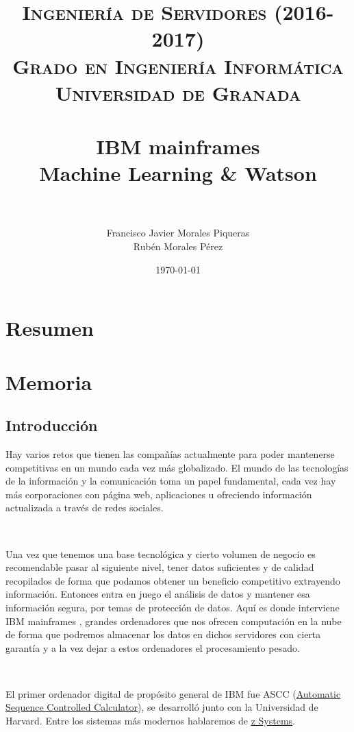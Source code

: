 \documentclass[paper=a4, fontsize=10pt]{scrartcl} %
\title{	
\normalfont \normalsize 
\textsc{\textbf{Ingeniería de Servidores (2016-2017)} \\ Grado en Ingeniería Informática \\ Universidad de Granada} \\ [25pt] %
\horrule{0.5pt} \\[0.4cm] %
\huge IBM mainframes \\ Machine Learning \& Watson \\ %
\horrule{2pt} \\[0.5cm] %
}
\author{Francisco Javier Morales Piqueras
	\\ Rubén Morales Pérez} %
\date{\normalsize\today} %
\numberwithin{equation}{section} %
\numberwithin{figure}{section} %
\numberwithin{table}{section} %
\begin{document}
\maketitle %
\newpage %
\tableofcontents %
\listoffigures
\listoftables

\newpage


\section{Resumen}


\section{Memoria}
\subsection{Introducción}
Hay varios retos que tienen las compañías actualmente para poder mantenerse competitivas en un mundo cada vez más globalizado.
El mundo de las tecnologías de la información y la comunicación toma un papel fundamental, cada vez hay más corporaciones con página web, aplicaciones u ofreciendo información actualizada a través de redes sociales.

\

Una vez que tenemos una base tecnológica  y cierto volumen de negocio es recomendable pasar al siguiente nivel, tener datos suficientes y de calidad recopilados de forma que podamos obtener un beneficio competitivo extrayendo información.
Entonces entra en juego el análisis de datos y mantener esa información segura, por temas de protección de datos.
Aquí es donde interviene IBM mainframes \cite{ibm-m}, grandes ordenadores que nos ofrecen computación en la nube de forma que podremos almacenar los datos en dichos servidores con cierta garantía y a la vez dejar a estos ordenadores el procesamiento pesado.

\

El primer ordenador digital de propósito general de IBM fue ASCC (\href{https://www-03.ibm.com/ibm/history/exhibits/markI/markI_intro.html}{Automatic Sequence Controlled Calculator}), se desarrolló junto con la Universidad de Harvard. Entre los sistemas más modernos hablaremos de \href{https://www-03.ibm.com/systems/z/}{z Systems}.
\end{document}
